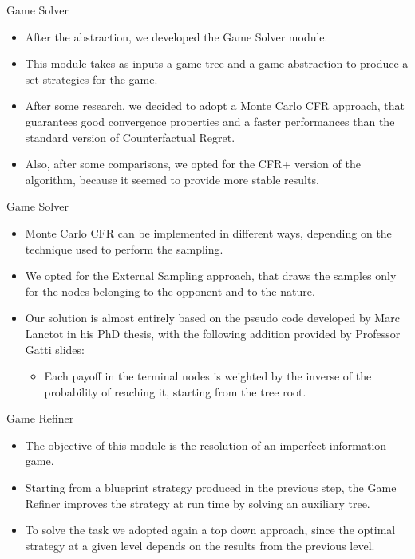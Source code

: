 \documentclass[11pt]{beamer}
\begin{document}
\begin{frame}{Game Solver}
\begin{itemize}
\item After the abstraction, we developed the Game Solver module.
\item This module takes as inputs a game tree and a game abstraction to produce a set strategies for the game.
\item After some research, we decided to adopt a Monte Carlo CFR approach, that guarantees good convergence properties and a faster performances than the standard version of Counterfactual Regret.
\item Also, after some comparisons, we opted for the CFR+ version of the algorithm, because it seemed to provide more stable results.
\end{itemize}
\end{frame}

\begin{frame}{Game Solver}
\begin{itemize}
\item Monte Carlo CFR can be implemented in different ways, depending on the technique used to perform the sampling.
\item We opted for the External Sampling approach, that draws the samples only for the nodes belonging to the opponent and to the nature.
\item Our solution is almost entirely based on the pseudo code developed by Marc Lanctot in his PhD thesis, with the following addition provided by Professor Gatti slides:
\begin{itemize}
\item Each payoff in the terminal nodes is weighted by the inverse of the probability of reaching it, starting from the tree root.
\end{itemize}
\end{itemize}
\end{frame}

\begin{frame}{Game Refiner}
\begin{itemize}
\item The objective of this module is the resolution of an imperfect information game. 
\item Starting from a blueprint strategy produced in the previous step, the Game Refiner improves the strategy at run time by solving an auxiliary tree.
\item To solve the task we adopted again a top down approach, since the optimal strategy at a given level depends on the results from the previous level.
\end{itemize}
\end{frame}
\end{document}
